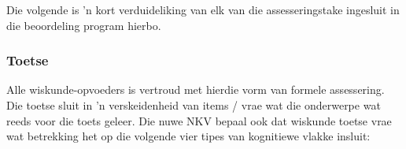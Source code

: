 Die volgende is 'n kort verduideliking van elk van die assesseringstake ingesluit in die beoordeling program hierbo.

\subsubsection{Toetse}
Alle wiskunde-opvoeders is vertroud met hierdie vorm van formele assessering. Die toetse sluit in 'n verskeidenheid van items / vrae wat die onderwerpe wat reeds voor die toets geleer. Die nuwe NKV bepaal ook dat wiskunde toetse vrae wat betrekking het op die volgende vier tipes van kognitiewe vlakke insluit:

